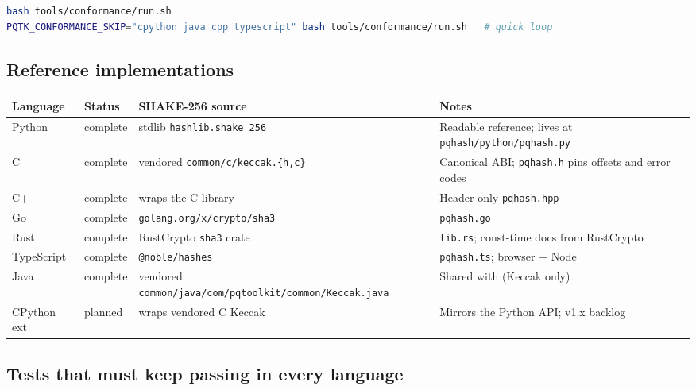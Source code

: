 \begin{lstlisting}[language=bash]
bash tools/conformance/run.sh
PQTK_CONFORMANCE_SKIP="cpython java cpp typescript" bash tools/conformance/run.sh   # quick loop
\end{lstlisting}

\subsection{Reference implementations}

\begin{center}
\small
\begin{tabular}{@{}llll@{}}
\toprule
\textbf{Language} & \textbf{Status} & \textbf{SHAKE-256 source}                          & \textbf{Notes} \\
\midrule
Python      & complete & stdlib \texttt{hashlib.shake\_256}            & Readable reference; lives at \texttt{pqhash/python/pqhash.py} \\
C           & complete & vendored \texttt{common/c/keccak.\{h,c\}}     & Canonical ABI; \texttt{pqhash.h} pins offsets and error codes \\
C++         & complete & wraps the C library                           & Header-only \texttt{pqhash.hpp} \\
Go          & complete & \texttt{golang.org/x/crypto/sha3}             & \texttt{pqhash.go} \\
Rust        & complete & RustCrypto \texttt{sha3} crate                & \texttt{lib.rs}; const-time docs from RustCrypto \\
TypeScript  & complete & \texttt{@noble/hashes}                        & \texttt{pqhash.ts}; browser + Node \\
Java        & complete & vendored \texttt{common/java/com/pqtoolkit/common/Keccak.java} & Shared with \pqcrypt{} (Keccak only) \\
CPython ext & planned  & wraps vendored C Keccak                       & Mirrors the Python API; v1.x backlog \\
\bottomrule
\end{tabular}
\end{center}

\subsection{Tests that must keep passing in every language}
\label{sec:conformance:tests}

